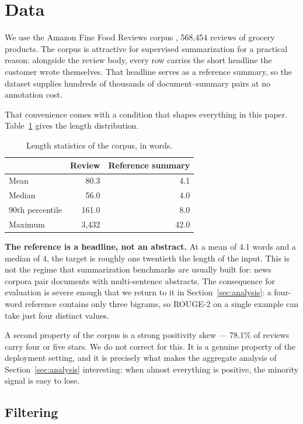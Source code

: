 \section{Data}
\label{sec:data}

We use the Amazon Fine Food Reviews corpus \cite{mcauley2013amazon}, 568{,}454
reviews of grocery products. The corpus is attractive for supervised
summarization for a practical reason: alongside the review body, every row
carries the short headline the customer wrote themselves. That headline serves
as a reference summary, so the dataset supplies hundreds of thousands of
document--summary pairs at no annotation cost.

That convenience comes with a condition that shapes everything in this paper.
Table~\ref{tab:lengths} gives the length distribution.

\begin{table}[t]
\caption{Length statistics of the corpus, in words.}
\label{tab:lengths}
\centering
\begin{tabular}{lrr}
\toprule
 & \textbf{Review} & \textbf{Reference summary} \\
\midrule
Mean            & 80.3   & 4.1  \\
Median          & 56.0   & 4.0  \\
90th percentile & 161.0  & 8.0  \\
Maximum         & 3{,}432 & 42.0 \\
\bottomrule
\end{tabular}
\end{table}

\textbf{The reference is a headline, not an abstract.} At a mean of 4.1 words
and a median of 4, the target is roughly one twentieth the length of the input.
This is not the regime that summarization benchmarks are usually built for:
news corpora pair documents with multi-sentence abstracts. The consequence for
evaluation is severe enough that we return to it in
Section~\ref{sec:analysis}: a four-word reference contains only three bigrams,
so ROUGE-2 on a single example can take just four distinct values.

A second property of the corpus is a strong positivity skew --- 78.1\% of
reviews carry four or five stars. We do not correct for this. It is a genuine
property of the deployment setting, and it is precisely what makes the
aggregate analysis of Section~\ref{sec:analysis} interesting: when almost
everything is positive, the minority signal is easy to lose.

\subsection{Filtering}

